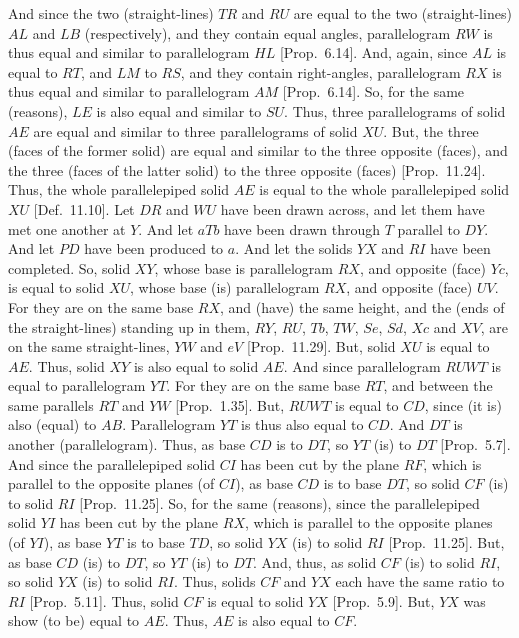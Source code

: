 And since the two (straight-lines) $TR$ and $RU$ are
equal to the two (straight-lines) $AL$ and $LB$ (respectively), and
they contain equal angles, parallelogram $RW$ is thus  equal
and similar to parallelogram $HL$ [Prop.~6.14]. 
And, again, since $AL$ is equal to $RT$, and $LM$ to $RS$, and they contain right-angles, parallelogram $RX$ is thus equal and similar to
parallelogram $AM$ [Prop.~6.14].  So, for the
same (reasons), $LE$ is also equal and similar to $SU$. Thus, three
parallelograms of solid $AE$ are equal and similar to three parallelograms of
 solid $XU$. But, the three (faces of the former solid)
are equal and similar to the three opposite (faces), and the three (faces
of the
latter solid) to the three opposite (faces) [Prop.~11.24]. Thus, the whole
parallelepiped solid $AE$ is equal to the whole parallelepiped solid
$XU$ [Def.~11.10]. Let $DR$ and
$WU$ have been drawn across, and let them have met one another at $Y$.
And let $aTb$ have been drawn through $T$ parallel to $DY$. And let
$PD$ have been produced to $a$. And let the solids $YX$ and $RI$ have been 
completed. So,  solid $XY$, whose base is parallelogram $RX$,
and opposite (face) $Yc$,  is equal to  solid $XU$, whose base
(is) parallelogram $RX$, and opposite (face) $UV$. For they are
on the same base $RX$, and (have) the same height,  and the (ends of the straight-lines) standing up in them, $RY$, $RU$, $Tb$, $TW$, $Se$, $Sd$, $Xc$ and $XV$, are on the same straight-lines, $YW$ and $eV$ 
[Prop.~11.29].  But, solid $XU$ is equal to
$AE$. Thus, solid $XY$ is also equal to solid $AE$. And since
parallelogram $RUWT$ is equal to parallelogram $YT$. For they are
on the same base $RT$, and between the same parallels $RT$ and $YW$
[Prop.~1.35]. But, $RUWT$ is equal to
$CD$, since (it is) also (equal) to $AB$. Parallelogram $YT$ is thus also
equal to $CD$. And $DT$ is another (parallelogram). Thus, as base $CD$
is to $DT$, so $YT$ (is) to $DT$ [Prop.~5.7]. 
And since the parallelepiped solid $CI$ has been cut by the plane
$RF$, which is parallel to the opposite planes (of $CI$), as  base $CD$
is to base $DT$, so solid $CF$ (is) to solid $RI$ [Prop.~11.25]. So, for the same (reasons), since the parallelepiped solid
$YI$ has been cut by the plane $RX$, which is parallel to the opposite
planes (of $YI$), as base $YT$ is to base $TD$, so solid $YX$ (is)
 to solid $RI$ [Prop.~11.25]. But, as base $CD$ (is) to $DT$, so $YT$ (is) to $DT$. And, thus, as solid $CF$ (is) to solid $RI$,
so solid $YX$ (is) to solid $RI$. Thus,  solids $CF$ and
$YX$ each have the same ratio to $RI$ [Prop.~5.11]. Thus, solid $CF$
is equal to solid $YX$ [Prop.~5.9]. But,
$YX$ was show (to be) equal to $AE$. Thus, $AE$ is also equal to
$CF$.

